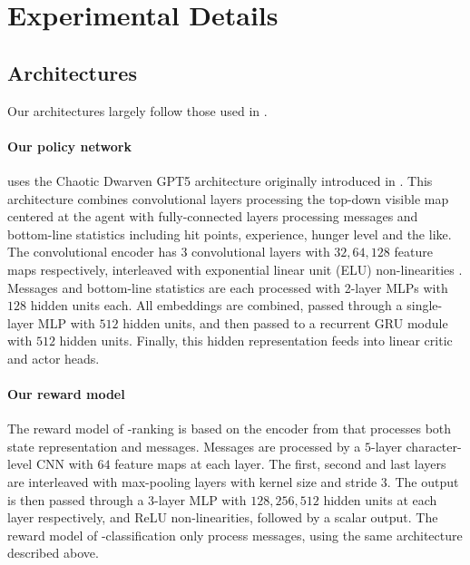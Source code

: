 \section{Experimental Details}
\label{sec:exp-details}

\subsection{Architectures}
\label{sec:architecture-details}

Our architectures largely follow those used in \citet{klissarovdoro2023motif}. 
\paragraph{Our policy network} uses the Chaotic Dwarven GPT5 architecture originally introduced in \citet{CDGPT5}. This architecture combines convolutional layers processing the top-down visible map centered at the agent with fully-connected layers processing messages and bottom-line statistics including hit points, experience, hunger level and the like. The convolutional encoder has $3$ convolutional layers with $32, 64, 128$ feature maps respectively, interleaved with exponential linear unit (ELU) non-linearities \citep{ELU}.  Messages and bottom-line statistics are each processed with 2-layer MLPs with $128$ hidden units each. All embeddings are combined, passed through a single-layer MLP with $512$ hidden units, and then passed to a recurrent GRU module \citep{GRU} with $512$ hidden units. Finally, this hidden representation feeds into linear critic and actor heads. 

\paragraph{Our reward model} The reward model of \oni-ranking is based on the encoder from \citet{kuettler2020nethack} that processes both state representation and messages. Messages are processed by a $5$-layer character-level CNN \citep{DBLP:journals/corr/ZhangZL15} with $64$ feature maps at each layer. The first, second and last layers are interleaved with max-pooling layers with kernel size and stride $3$. The output is then passed through a $3$-layer MLP with $128, 256, 512$ hidden units at each layer respectively, and ReLU non-linearities, followed by a scalar output. The reward model of \oni-classification only process messages, using the same architecture described above.

